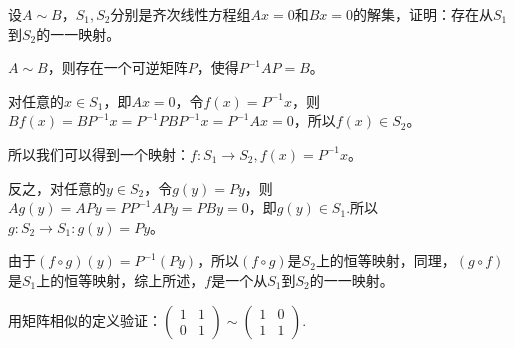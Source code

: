 \documentclass[a4paper]{report}
\begin{document}
\EX 设$A\sim B$，$S_1,S_2$分别是齐次线性方程组$Ax=0$和$Bx=0$的解集，证明：存在从$S_1$到$S_2$的一一映射。

\begin{zhengming}
$A\sim B$，则存在一个可逆矩阵$P$，使得$P^{-1}AP=B$。

对任意的$x\in S_1$，即$Ax=0$，令$f(x)=P^{-1}x$，则$Bf(x)=BP^{-1}x=P^{-1}PBP^{-1}x=P^{-1}Ax=0$，所以$f(x)\in S_2$。

所以我们可以得到一个映射：$f:S_1\rightarrow S_2,f(x)=P^{-1}x$。

反之，对任意的$y\in S_2$，令$g(y)=Py$，则$Ag(y)=APy=PP^{-1}APy=PBy=0$，即$g(y)\in S_1$.所以$g:S_2\rightarrow S_1:g(y)=Py$。

由于$(f\circ g)(y)=P^{-1}(Py)$，所以$(f\circ g)$是$S_2$上的恒等映射，同理，$(g\circ f)$是$S_1$上的恒等映射，综上所述，$f$是一个从$S_1$到$S_2$的一一映射。
\end{zhengming}

\EX 用矩阵相似的定义验证：$
\begin{pmatrix}
1&1\\0&1
\end{pmatrix}\sim
\begin{pmatrix}
1&0\\1&1
\end{pmatrix}
$.
\end{document}
